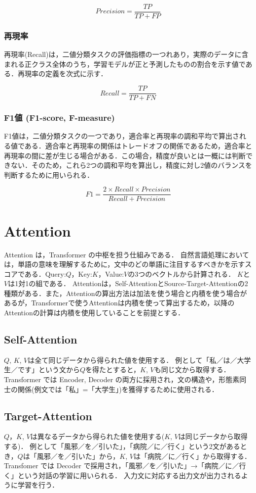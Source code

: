 $$
Precision = \frac{TP}{TP+FP}
$$


\subsubsection{再現率 \label{c4s2-1c}}
再現率(Recall)は，二値分類タスクの評価指標の一つれあり，実際のデータに含まれる正クラス全体のうち，学習モデルが正と予測したものの割合を示す値である．再現率の定義を次式に示す．

$$
Recall = \frac{TP}{TP+FN}
$$

\subsubsection{F1値 (F1-score, F-measure) \label{c4s2-1d}}
F1値は，二値分類タスクの一つであり，適合率と再現率の調和平均で算出される値である．適合率と再現率の関係はトレードオフの関係であるため，適合率と再現率の間に差が生じる場合がある．この場合，精度が良いとは一概には判断できない．そのため，これら2つの調和平均を算出し，精度に対し2値のバランスを判断するために用いられる．

$$
F1 = \frac{2 \times Recall \times Precision}{Recall+Precision}
$$


\section{Attention \label{c4s3}}
Attention は，Transformer の中枢を担う仕組みである．
自然言語処理においては，単語の意味を理解するために，文中のどの単語に注目するすべきかを示すスコアである．Query:${Q}$，Key:${K}$，Value:${V}$の3つのベクトルから計算される．
${K}$と${V}$は1対1の組である．
Attentionは，Self-AttentionとSource-Target-Attentionの2種類がある．また，Attentionの算出方法は加法を使う場合と内積を使う場合があるが，Transformerで使うAttentionは内積を使って算出するため，以降のAttentionの計算は内積を使用していることを前提とする．

\subsection{Self-Attention \label{c4s3-1a}}
${Q}$, ${K}$, ${V}$は全て同じデータから得られた値を使用する．
例として「私／は／大学生／です」という文から${Q}$を得たとすると，${K}$, ${V}$も同じ文から取得する．Transformer では Encoder, Decoder の両方に採用され，文の構造や，形態素同士の関係(例文では「私」=「大学生」)を獲得するために使用される．

\subsection{Target-Attention \label{c4s3-1b}}
${Q}$，${K}$, ${V}$は異なるデータから得られた値を使用する(${K}$, ${V}$は同じデータから取得する)．
例として「風邪／を／引いた」，「病院／に／行く」という2文があるとき，${Q}$は「風邪／を／引いた」から，${K}$, ${V}$は「病院／に／行く」から取得する．
 Transfomer では Decoder で採用され，「風邪／を／引いた」→「病院／に／行く」という対話の学習に用いられる．
入力文に対応する出力文が出力されるように学習を行う．

